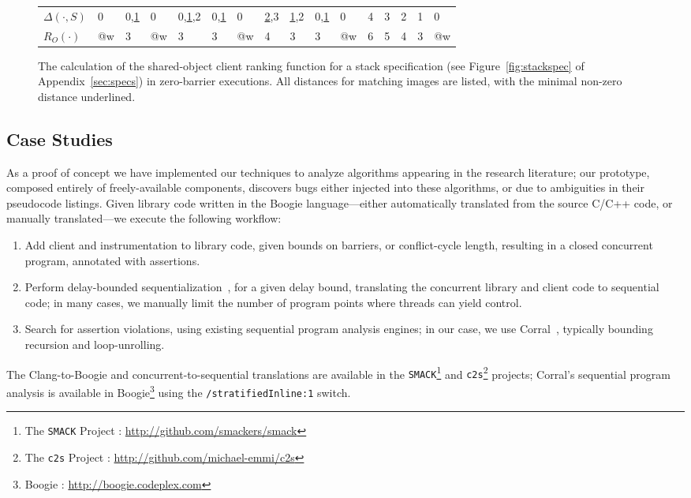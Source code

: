 \begin{figure}[t]
\begin{tabular}{|l|p{4mm}p{6mm}p{4mm}p{8mm}p{6mm}p{4mm}p{6mm}p{6mm}p{6mm}%
    p{4mm}p{4mm}p{4mm}p{4mm}p{4mm}p{4mm}|}
    $\Delta(\cdot,S)$ %
    & 0 & 0,\underline{1} & 0 & 0,\underline{1},2 & 0,\underline{1} & 0 & \underline{2},3 & \underline{1},2 & 0,\underline{1} & 0 & 4 & 3 & 2 & 1 & 0 \\
    $R_O(\cdot)$
    & @w & 3 & @w & 3 & 3 & @w & 4 & 3 & 3 & @w & 6 & 5 & 4 & 3 & @w \\
    \hline
  \end{tabular}
  \caption{The calculation of the shared-object client ranking function for
    a stack specification (see Figure~\ref{fig:stackspec} of 
    Appendix~\ref{sec:specs}) in zero-barrier executions.  All distances for 
    matching images are listed, with the minimal non-zero distance underlined.}
  \label{fig:client:dist}
  \vspace{-5mm}
\end{figure}


\subsection{Case Studies}
\label{sec:exp}

As a proof of concept we have implemented our techniques to analyze algorithms
appearing in the research literature; our prototype, composed entirely of
freely-available components, discovers bugs either injected into these
algorithms, or due to ambiguities in their pseudocode listings. Given library
code written in the Boogie language---either automatically translated from the
source C/C++ code, or manually translated---we execute the following workflow:
\begin{enumerate}
  \item Add client and instrumentation to library code, given bounds on 
    barriers, or conflict-cycle length, resulting in a closed concurrent 
    program, annotated with assertions.
  \item Perform delay-bounded sequentialization~\citep{ conf/popl/EmmiQR11},
    for a given delay bound, translating the concurrent library and client 
    code to sequential code; in many cases, we manually limit the number of 
    program points where threads can yield control.
  \item Search for assertion violations, using existing sequential program
    analysis engines; in our case, we use Corral~\citep{ conf/cav/LalQL12},
    typically bounding recursion and loop-unrolling.
\end{enumerate}
The Clang-to-Boogie and concurrent-to-sequential translations are available in
the {\tt SMACK}\footnote{The {\tt SMACK} Project :
\url{http://github.com/smackers/smack}} and {\tt c2s}\footnote{The {\tt c2s}
Project : \url{http://github.com/michael-emmi/c2s}} projects; Corral's
sequential program analysis is available in Boogie\footnote{Boogie :
\url{http://boogie.codeplex.com}} using the {\tt\small /stratifiedInline:1}
switch.

